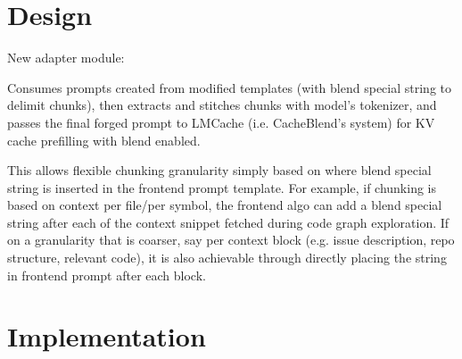 \section{Design}
\label{sec:ch3_design}
New adapter module:

Consumes prompts created from modified templates (with blend special string to delimit chunks), then extracts and stitches chunks with model's tokenizer, and passes the final forged prompt to LMCache (i.e. CacheBlend's system) for KV cache prefilling with blend enabled.

This allows flexible chunking granularity simply based on where blend special string is inserted in the frontend prompt template. For example, if chunking is based on context per file/per symbol, the frontend algo can add a blend special string after each of the context snippet fetched during code graph exploration. If on a granularity that is coarser, say per context block (e.g. issue description, repo structure, relevant code), it is also achievable through directly placing the string in frontend prompt after each block.

\section{Implementation}
